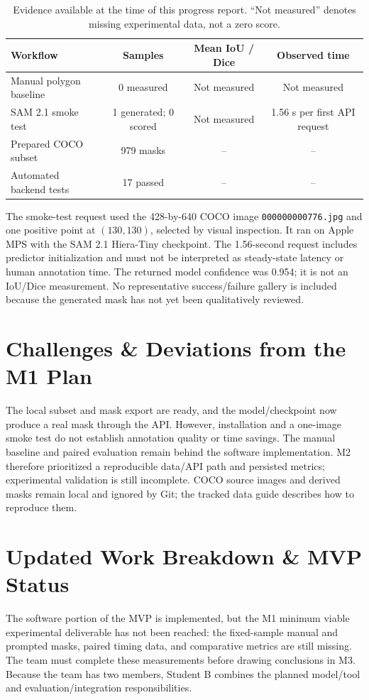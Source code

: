 \documentclass[11pt]{article}
\begin{document}
\begin{table}[ht]
\centering
\caption{Evidence available at the time of this progress report. ``Not
measured'' denotes missing experimental data, not a zero score.}
\label{tab:prelim}
\begin{tabular}{@{}lccc@{}}
\toprule
\textbf{Workflow} & \textbf{Samples} & \textbf{Mean IoU / Dice} & \textbf{Observed time} \\
\midrule
Manual polygon baseline & 0 measured & Not measured & Not measured \\
SAM 2.1 smoke test & 1 generated; 0 scored & Not measured & 1.56 s per first API request \\
\midrule
Prepared COCO subset & 979 masks & -- & -- \\
Automated backend tests & 17 passed & -- & -- \\
\bottomrule
\end{tabular}
\end{table}

The smoke-test request used the 428-by-640 COCO image
\texttt{000000000776.jpg} and one positive point at $(130,130)$, selected by
visual inspection. It ran on Apple MPS with the SAM 2.1 Hiera-Tiny checkpoint.
The 1.56-second request includes predictor initialization and must not be
interpreted as steady-state latency or human annotation time. The returned
model confidence was 0.954; it is not an IoU/Dice measurement. No representative
success/failure gallery is included because the generated mask has not yet
been qualitatively reviewed.

\section{Challenges \& Deviations from the M1 Plan}
\label{sec:challenges}
The local subset and mask export are ready, and the model/checkpoint now produce
a real mask through the API. However, installation and a one-image smoke test
do not establish annotation quality or time savings. The manual baseline and
paired evaluation remain behind the software implementation. M2 therefore
prioritized a reproducible data/API path and persisted metrics; experimental
validation is still incomplete. COCO source images and derived masks remain
local and ignored by Git; the tracked data guide describes how to reproduce
them.

\section{Updated Work Breakdown \& MVP Status}
\label{sec:workbreakdown}
The software portion of the MVP is implemented, but the M1 minimum viable
experimental deliverable has not been reached: the fixed-sample manual and
prompted masks, paired timing data, and comparative metrics are still missing.
The team must complete these measurements before drawing conclusions in M3.
Because the team has two members, Student B combines the planned model/tool
and evaluation/integration responsibilities.
\end{document}
